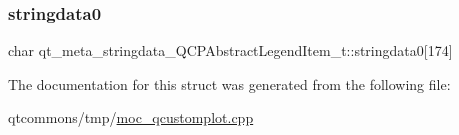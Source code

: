 \subsubsection{\texorpdfstring{stringdata0}{stringdata0}}
{\footnotesize\ttfamily char qt\+\_\+meta\+\_\+stringdata\+\_\+\+Q\+C\+P\+Abstract\+Legend\+Item\+\_\+t\+::stringdata0\mbox{[}174\mbox{]}}



The documentation for this struct was generated from the following file\+:\begin{DoxyCompactItemize}
\item 
qtcommons/tmp/\mbox{\hyperlink{moc__qcustomplot_8cpp}{moc\+\_\+qcustomplot.\+cpp}}\end{DoxyCompactItemize}
